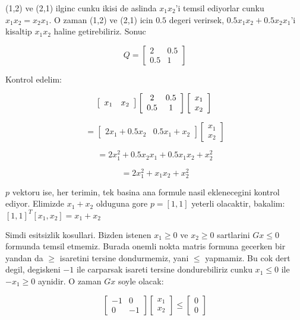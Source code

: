 \documentclass[12pt,fleqn]{article}
\begin{document}
(1,2) ve (2,1) ilginc cunku ikisi de aslinda $x_1x_2$'i temsil
ediyorlar cunku $x_1x_2 = x_2x_1$. O zaman (1,2) ve (2,1) icin $0.5$
degeri verirsek, $0.5x_1x_2 + 0.5x_2x_1$'i kisaltip $x_1x_2$ haline
getirebiliriz. Sonuc

\[ 
Q = \left[ \begin{array}{cc}
    2 & 0.5 \\
    0.5 & 1
\end{array} \right]
 \]

Kontrol edelim:

\[ 
 \left[ \begin{array}{cc}
    x_1 & x_2 
\end{array} \right]
\left[ \begin{array}{cc}
    2 & 0.5 \\
    0.5 & 1
\end{array} \right]
\left[ \begin{array}{c}
    x_1 \\
    x_2 
\end{array} \right] \\
 \]

\[ 
= \left[ \begin{array}{cc}
    2x_1 + 0.5x_2 & 0.5x_1 + x_2 
\end{array} \right]
\left[ \begin{array}{c}
    x_1 \\
    x_2 
\end{array} \right] 
 \]

\[ = 2x_1^2 + 0.5x_2x_1 + 0.5x_1x_2 + x_2^2  \]

\[ = 2x_1^2 + x_1x_2 + x_2^2  \]

$p$ vektoru ise, her terimin, tek basina ana formule nasil eklenecegini kontrol
ediyor. Elimizde $x_1 + x_2$ olduguna gore $p = [1, 1]$ yeterli olacaktir,
bakalim: $[1, 1]^T[x_1, x_2] = x_1 + x_2$

Simdi esitsizlik kosullari. Bizden istenen $x_1 \geq 0$ ve $x_2 \geq 0$
sartlarini $Gx \leq 0$ formunda temsil etmemiz. Burada onemli nokta matris
formuna gecerken bir yandan da $\geq$ isaretini tersine dondurmemiz, yani $\leq$
yapmamiz. Bu cok dert degil, degiskeni $-1$ ile carparsak isareti tersine
dondurebiliriz cunku $x_1 \leq 0$ ile $-x_1 \geq 0$ aynidir. O zaman $Gx$ soyle
olacak: 

\[ 
\left[ \begin{array}{cc}
    -1 & 0 \\
    0 & -1
\end{array} \right]
\left[ \begin{array}{c}
    x_1 \\
    x_2
\end{array} \right]
\leq
\left[ \begin{array}{c}
    0 \\
    0
\end{array} \right]
 \]
\end{document}
